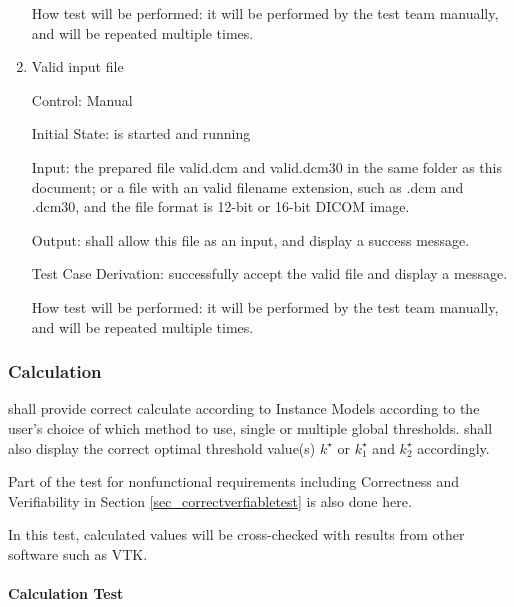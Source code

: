 \documentclass[12pt, titlepage]{article}
\begin{document}
\begin{enumerate}
How test will be performed: it will be performed by the test team manually, and
will be repeated multiple times.  

\item{Valid input file}

Control: Manual
					
Initial State: \progname{} is started and running
					
Input: the prepared file valid.dcm and valid.dcm30 in the same folder as this
document; or a file with an valid filename extension, such as .dcm and .dcm30,
and the file format is 12-bit or 16-bit DICOM image.
					
Output: \progname{} shall allow this file as an input, and display a success
message.

Test Case Derivation: successfully accept the valid file and display a message.

How test will be performed: it will be performed by the test team manually, and
will be repeated multiple times.
\end{enumerate}

\subsubsection{Calculation}
\label{sec_caltest} \progname{} shall provide correct calculate according to
Instance Models according to the user's choice of which method to use, single or
multiple global thresholds. \progname{} shall also display the correct optimal
threshold value(s) $k^{\star}$ or $k^{\star}_{1}$ and $k^{\star}_{2}$
accordingly.

Part of the test for nonfunctional requirements including Correctness and
Verifiability in Section \ref{sec_correctverfiabletest} is also done here.

In this test, calculated values will be cross-checked with results from other
software such as VTK.  
		
\paragraph{Calculation Test}
\end{document}
